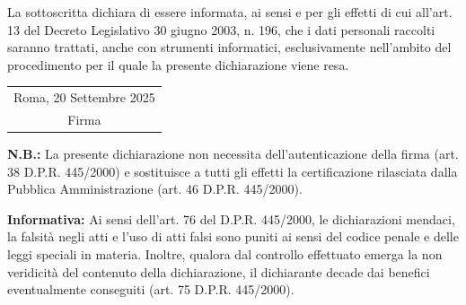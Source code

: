 \documentclass[a4paper,11pt]{article}
\begin{document}


\vspace{0.5cm}

\noindent La sottoscritta dichiara di essere informata, ai sensi e per gli effetti di cui all'art. 13 del Decreto Legislativo 30 giugno 2003, n. 196, che i dati personali raccolti saranno trattati, anche con strumenti informatici, esclusivamente nell'ambito del procedimento per il quale la presente dichiarazione viene resa.

\vspace{0.5cm}

\begin{flushright}
\begin{tabular}{c}
Roma, 20 Settembre 2025
\\
Firma \\
\end{tabular}
\end{flushright}

\vspace{0.5cm}

\noindent \textbf{N.B.:} La presente dichiarazione non necessita dell'autenticazione della firma (art. 38 D.P.R. 445/2000) e sostituisce a tutti gli effetti la certificazione rilasciata dalla Pubblica Amministrazione (art. 46 D.P.R. 445/2000).

\vspace{0.3cm}

\noindent \textbf{Informativa:} Ai sensi dell'art. 76 del D.P.R. 445/2000, le dichiarazioni mendaci, la falsità negli atti e l'uso di atti falsi sono puniti ai sensi del codice penale e delle leggi speciali in materia. Inoltre, qualora dal controllo effettuato emerga la non veridicità del contenuto della dichiarazione, il dichiarante decade dai benefici eventualmente conseguiti (art. 75 D.P.R. 445/2000).
\end{document}

